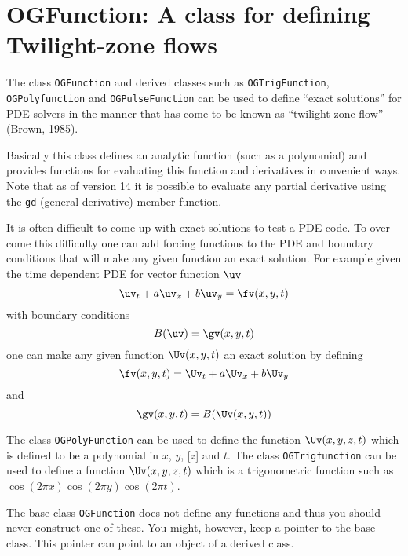 \section{OGFunction: A class for defining Twilight-zone flows}

The class {\tt OGFunction} and derived classes such as
{\tt OGTrigFunction}, {\tt OGPolyfunction} and {\tt OGPulseFunction} can be used
to define ``exact solutions'' for PDE solvers in the 
manner that has come to be known as ``twilight-zone flow''
(Brown, 1985).

Basically this class defines an analytic function (such 
as a polynomial) and provides functions for evaluating
this function and derivatives in convenient ways. Note that 
as of version 14 it is possible to evaluate any partial
derivative using the {\tt gd} (general derivative) member function.

It is often difficult to come up with exact solutions 
to test a PDE code. 
To over come this difficulty one
can add forcing functions to the PDE and boundary
conditions that will make any given function an
exact solution. For example given the time
dependent PDE for vector function $\uv$ 
$$
  \uv_t + a \uv_x + b \uv_y = \fv(x,y,t)
$$
with boundary conditions
$$
  B(\uv)=\gv(x,y,t)
$$
one can make any given function $\Uv(x,y,t)$ an exact solution
by defining
$$
 \fv(x,y,t) = \Uv_t + a \Uv_x + b \Uv_y
$$
and
$$
  \gv(x,y,t)=B(\Uv(x,y,t))
$$

The class {\tt OGPolyFunction} can be used to define the function 
$\Uv(x,y,z,t)$
which is defined to be a polynomial in $x$, $y$, [$z$] and $t$.
The class {\tt OGTrigfunction} can be used to define a function $\Uv(x,y,z,t)$
which is a trigonometric function such as $\cos(2\pi x)\cos(2\pi y)\cos(2\pi t)$.


The base class {\tt OGFunction} does not define any functions and thus you should
never construct one of these. You might, however, keep a pointer to the
base class. This pointer can point to an object of a derived class.




\vfill\eject 
\subsection{}

